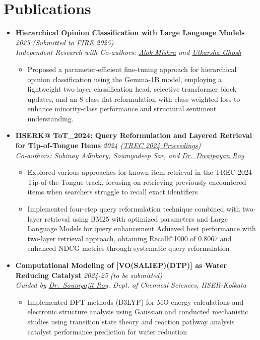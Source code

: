 \documentclass[a4paper,9pt]{article}
\newcommand{\resumeProject}[4]{
    \item\small{
        \textbf{#1} \hfill \textit{#2}\\
        \textit{#3}\\
        \begin{itemize}[leftmargin=1.5em,label=\textbullet,nosep,itemsep=0.5pt]
            #4
        \end{itemize}
    }\vspace{2pt}
}
\newcommand{\compactSection}[2]{
    \section{#1}
    \vspace{-0.1cm}
    #2
    \vspace{-0.2cm}
}
\begin{document}
\compactSection{Publications}{
\begin{itemize}[leftmargin=*,label={},itemsep=4pt]

    \resumeProject{Hierarchical Opinion Classification with Large Language Models}{2025 (Submitted to FIRE 2025)}
    {Independent Research with Co-authors: \href{https://alok-mishra6.github.io/}{Alok Mishra} and \href{https://utkarshaghosh.netlify.app/}{Utkarsha Ghosh}}
    {\item Proposed a parameter-efficient fine-tuning approach for hierarchical opinion classification using the Gemma-1B model, employing a lightweight two-layer classification head, selective transformer block updates, and an 8-class flat reformulation with class-weighted loss to enhance minority-class performance and structural sentiment understanding.}

    \resumeProject{IISERK@ ToT\_2024: Query Reformulation and Layered Retrieval for Tip-of-Tongue Items}{2024 (\href{https://trec.nist.gov/pubs/trec33/papers/IISER-K.tot.pdf}{TREC 2024 Proceedings})}
    {Co-authors: Subinay Adhikary, Soumyadeep Sar, and \href{https://dwaipayanroy.github.io/}{Dr.\ Dwaipayan Roy}}
    {\item Explored various approaches for known-item retrieval in the TREC 2024 Tip-of-the-Tongue track, focusing on retrieving previously encountered items when searchers struggle to recall exact identifiers
    \item Implemented four-step query reformulation technique combined with two-layer retrieval using BM25 with optimized parameters and Large Language Models for query enhancement
    Achieved best performance with two-layer retrieval approach, obtaining Recall@1000 of 0.8067 and enhanced NDCG metrics through systematic query reformulation}



    \resumeProject{Computational Modeling of [VO(SALIEP)(DTP)] as Water Reducing Catalyst}{2024-25 (to be submitted)}
    {Guided by \href{https://soumyajit-roy.com/}{Dr.\ Soumyajit Roy}, Dept. of Chemical Sciences, IISER-Kolkata}
    {\item Implemented DFT methods (B3LYP) for MO energy calculations and electronic structure analysis using Gaussian and conducted mechanistic studies using transition state theory and reaction pathway analysis catalyst performance prediction for water reduction}


\end{itemize}
}
\end{document}
